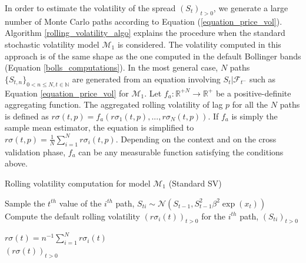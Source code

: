 \documentclass[11pt,a4,twosided,singlespacing,titlepagenumber=on]{scrreprt}
\numberwithin{equation}{chapter} %
\theoremstyle{remark}
\begin{document}


In order to estimate the volatility of the spread $(S_t)_{t>0}$, we generate a large number of Monte Carlo paths according to Equation (\ref{equation_price_vol}). Algorithm \ref{rolling_volatility_algo} explains the procedure when the standard stochastic volatility model $\mathcal{M}_1$ is considered. The volatility computed in this approach is of the same shape as the one computed in the default Bollinger bands (Equation \ref{bolls_computations}). In the most general case, $N$ paths $\{S_{t,n}\}_{0 < n \leq N, t \in \mathbb{N}}$ are generated from an equation involving $S_t | \mathcal{F}_{t^-}$ such as Equation \ref{equation_price_vol} for $\mathcal{M}_1$. Let $f_a : \mathbb{R}^{+N} \rightarrow \mathbb{R}^+$ be a positive-definite aggregating function. The aggregated rolling volatility of lag $p$ for all the $N$ paths is defined as $r\sigma(t,p) = f_a(r\sigma_1(t, p),...,r\sigma_N(t, p))$. If $f_a$ is simply the sample mean estimator, the equation is simplified to $r\sigma(t,p) = \frac{1}{N}\sum_{i=1}^N r\sigma_i(t, p)$. Depending on the context and on the cross validation phase, $f_a$ can be any measurable function satisfying the conditions above.

\begin{algorithm}
\caption{Rolling volatility computation for model $\mathcal{M}_1$ (Standard SV)}
\label{rolling_volatility_algo}
\begin{algorithmic}[1]

		\State Sample the $t^{th}$ value of the $i^{th}$ path, $S_{ti} \sim \mathcal{N}(S_{t-1}, S_{t-1}^2 \beta^2 \exp(x_t))$
	\State Compute the default rolling volatility $(r\sigma_i(t))_{t>0}$ for the $i^{th}$ path, $(S_{ti})_{t>0}$

	\State $\displaystyle{r\sigma(t) = n^{-1} \sum_{i=1}^N r\sigma_i(t)}$
\\
\Return $(r\sigma(t))_{t>0}$
\EndProcedure
\end{algorithmic}
\end{algorithm}
\end{document}
